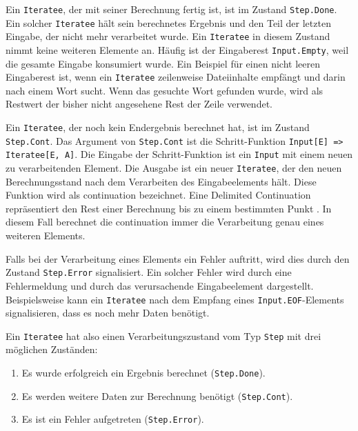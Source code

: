 Ein \lstinline|Iteratee|, der mit seiner Berechnung fertig ist, ist im Zustand \lstinline|Step.Done|.
Ein solcher \lstinline|Iteratee| hält sein berechnetes Ergebnis und den Teil der letzten Eingabe, der nicht mehr verarbeitet wurde.
Ein \lstinline|Iteratee| in diesem Zustand nimmt keine weiteren Elemente an.
Häufig ist der Eingaberest \lstinline|Input.Empty|, weil die gesamte Eingabe konsumiert wurde.
Ein Beispiel für einen nicht leeren Eingaberest ist, wenn ein \lstinline|Iteratee| zeilenweise Dateiinhalte empfängt und darin nach einem Wort sucht.
Wenn das gesuchte Wort gefunden wurde, wird als Restwert der bisher nicht angesehene Rest der Zeile verwendet.

Ein \lstinline|Iteratee|, der noch kein Endergebnis berechnet hat, ist im Zustand \lstinline|Step.Cont|.
Das Argument von \lstinline|Step.Cont| ist die Schritt-Funktion \lstinline[breaklines=true]|Input[E] => Iteratee[E, A]|.
Die Eingabe der Schritt-Funktion ist ein \lstinline|Input| mit einem neuen zu verarbeitenden Element.
Die Ausgabe ist ein neuer \lstinline|Iteratee|, der den neuen Berechnungsstand nach dem Verarbeiten des Eingabeelements hält.
Diese Funktion wird als \gls{continuation} bezeichnet.
Eine Delimited Continuation repräsentiert den Rest einer Berechnung bis zu einem bestimmten Punkt \cite[vgl.][S.~1]{continuations}.
In diesem Fall berechnet die \gls{continuation} immer die Verarbeitung genau eines weiteren Elements.

Falls bei der Verarbeitung eines Elements ein Fehler auftritt, wird dies durch den Zustand \lstinline|Step.Error| signalisiert.
Ein solcher Fehler wird durch eine Fehlermeldung und durch das verursachende Eingabeelement dargestellt.
Beispielsweise kann ein \lstinline|Iteratee| nach dem Empfang eines \lstinline|Input.EOF|-Elements signalisieren, dass es noch mehr Daten benötigt.

Ein \lstinline|Iteratee| hat also einen Verarbeitungszustand vom Typ \lstinline|Step| mit drei möglichen Zuständen:
\begin{enumerate}
  \item Es wurde erfolgreich ein Ergebnis berechnet (\lstinline|Step.Done|).
  \item Es werden weitere Daten zur Berechnung benötigt (\lstinline|Step.Cont|).
  \item Es ist ein Fehler aufgetreten (\lstinline|Step.Error|).
\end{enumerate}

